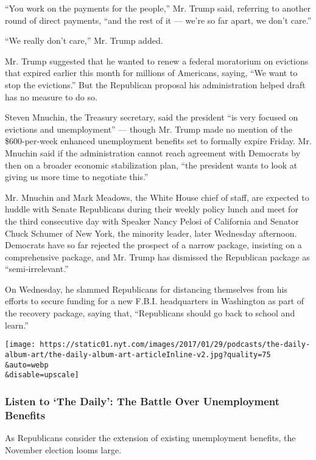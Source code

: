 ``You work on the payments for the people,'' Mr. Trump said, referring
to another round of direct payments, ``and the rest of it --- we're so
far apart, we don't care.''

``We really don't care,'' Mr. Trump added.

Mr. Trump suggested that he wanted to renew a federal moratorium on
evictions that expired earlier this month for millions of Americans,
saying, ``We want to stop the evictions.'' But the Republican proposal
his administration helped draft has no measure to do so.

Steven Mnuchin, the Treasury secretary, said the president ``is very
focused on evictions and unemployment'' --- though Mr. Trump made no
mention of the \$600-per-week enhanced unemployment benefits set to
formally expire Friday. Mr. Mnuchin said if the administration cannot
reach agreement with Democrats by then on a broader economic
stabilization plan, ``the president wants to look at giving us more time
to negotiate this.''

Mr. Mnuchin and Mark Meadows, the White House chief of staff, are
expected to huddle with Senate Republicans during their weekly policy
lunch and meet for the third consecutive day with Speaker Nancy Pelosi
of California and Senator Chuck Schumer of New York, the minority
leader, later Wednesday afternoon. Democrats have so far rejected the
prospect of a narrow package, insisting on a comprehensive package, and
Mr. Trump has dismissed the Republican package as ``semi-irrelevant.''

On Wednesday, he slammed Republicans for distancing themselves from his
efforts to secure funding for a new F.B.I. headquarters in Washington as
part of the recovery package, saying that, ``Republicans should go back
to school and learn.''

\texttt{[image: https://static01.nyt.com/images/2017/01/29/podcasts/the-daily-album-art/the-daily-album-art-articleInline-v2.jpg?quality=75\\\&auto=webp\\\&disable=upscale]}

\hypertarget{listen-to-the-daily-the-battle-over-unemployment-benefits}{%
\subsubsection{Listen to `The Daily': The Battle Over Unemployment
Benefits}\label{listen-to-the-daily-the-battle-over-unemployment-benefits}}

As Republicans consider the extension of existing unemployment benefits,
the November election looms large.


